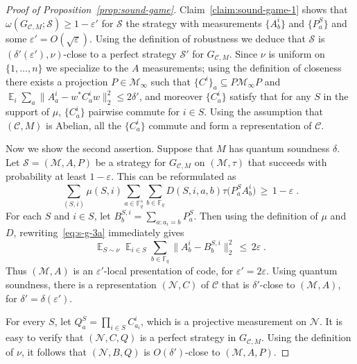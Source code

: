 \documentclass[11pt]{article}
\theoremstyle{definition}
\newcommand{\code}{\mathcal{C}}
\newcommand{\strategy}{\mathscr{S}}
\DeclareMathOperator*{\Expectation}{\mathbb{E}}
\newcommand{\Es}[1]{\Expectation_{#1}}
\newcommand{\F}{\ensuremath{\mathbb{F}}}
\newcommand{\mM}{\ensuremath{\mathcal{M}}}
\newcommand{\eps}{\varepsilon}
\newcommand{\mN}{\mathcal{N}}
\begin{document}
\begin{proof}[Proof of Proposition~\ref{prop:sound-game}]
Claim~\ref{claim:sound-game-1} shows that $\omega(G_{\code,M};\strategy)\geq 1-\eps'$ for $\strategy$ the strategy with measurements $\{A^i_b\}$ and $\{P^{S}_a\}$ and some $\eps'=O(\sqrt{\eps})$. Using the definition of robustness we deduce that $\strategy$ is $(\delta'(\eps'),\nu)$-close to a perfect strategy $\strategy'$ for $G_{\code,M}$. Since $\nu$ is uniform on $\{1,\ldots,n\}$ we specialize to the $A$ measurements; using the definition of closeness there exists a projection $P\in \mM_\infty$ such that $\{C^i\}_a \subseteq P\mM_\infty P$ and $\Es{i}\sum_a \|A^i_a-w^* C^i_a w \|_2^2 \leq 2\delta'$, and moreover $\{C^i_a\}$ satisfy that for any $S$ in the support of $\mu$, $\{C^i_a\}$ pairwise commute for $i\in S$. Using the assumption that $(\code,M)$ is Abelian, all the $\{C^i_a\}$ commute and form a representation of $\code$.

Now we show the second assertion. Suppose that $M$ has quantum soundness $\delta$.
Let $\strategy=(\mM,A,P)$ be a strategy for $G_{\code,M}$ on $(\mM,\tau)$ that succeeds with probability at least $1-\eps$. This can be reformulated as 
\begin{equation}
 \sum_{(S,i)} \mu(S,i) \sum_{a\in \F_q^s}\sum_{b\in\F_q} D(S,i,a,b) \tau\big(  P^S_a  A^i_{b}\big) \,\geq \,1-\eps\;.\label{eq:s-g-3a}
\end{equation}
For each $S$ and $i\in S$, let $B^{S,i}_b = \sum_{a:a_i=b} P^S_a$. Then using the definition of $\mu$ and $D$, rewriting~\eqref{eq:s-g-3a} immediately gives
\begin{equation}
 \Es{S\sim \nu} \Es{i\in S} \sum_{b\in\F_q} \big\| A^i_{b} - B^{S,i}_b\big\|_2^2 \,\leq \,2\eps\;.\label{eq:s-g-3}
\end{equation}
Thus $(\mM,A)$ is an $\eps'$-local presentation of code, for $\eps'=2\eps$. Using quantum soundness, there is a representation $(\mN,C)$ of $\code$ that is $\delta'$-close to $(\mM,A)$, for $\delta'=\delta(\eps')$. 

For every $S$, let $Q^S_a = \prod_{i\in S} C^i_{a_i}$, which is a projective measurement on $\mN$. It is easy to verify that $(\mN,C,Q)$ is a perfect strategy in $G_{\code,M}$. Using the definition of $\nu$, it follows that   $(\mN,B,Q)$ is $O({\delta'})$-close to $(\mM,A,P)$.


\end{proof}
\end{document}
